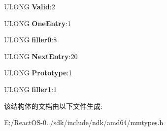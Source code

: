 \begin{DoxyCompactItemize}
\mbox{\label{struct___m_m_p_t_e___l_i_s_t_a722a9b980c44514711ad30a50ba45e0f}} 
U\+L\+O\+NG {\bfseries Valid}\+:2
\item 
\mbox{\label{struct___m_m_p_t_e___l_i_s_t_a47203ba88a5f54d28c7cbf015a929606}} 
U\+L\+O\+NG {\bfseries One\+Entry}\+:1
\item 
\mbox{\label{struct___m_m_p_t_e___l_i_s_t_a6b712ad39fee716c67febe983946dc91}} 
U\+L\+O\+NG {\bfseries filler0}\+:8
\item 
\mbox{\label{struct___m_m_p_t_e___l_i_s_t_a9874bd31378e7eca1c4f8f26fb70902d}} 
U\+L\+O\+NG {\bfseries Next\+Entry}\+:20
\item 
\mbox{\label{struct___m_m_p_t_e___l_i_s_t_a298e39fda0ee68c0544345355a5bf88b}} 
U\+L\+O\+NG {\bfseries Prototype}\+:1
\item 
\mbox{\label{struct___m_m_p_t_e___l_i_s_t_a3e3210bab5e9e6ad9ff51a741ec113f0}} 
U\+L\+O\+NG {\bfseries filler1}\+:1
\end{DoxyCompactItemize}


该结构体的文档由以下文件生成\+:\begin{DoxyCompactItemize}
\item 
E\+:/\+React\+O\+S-\/0../sdk/include/ndk/amd64/mmtypes.\+h\end{DoxyCompactItemize}

